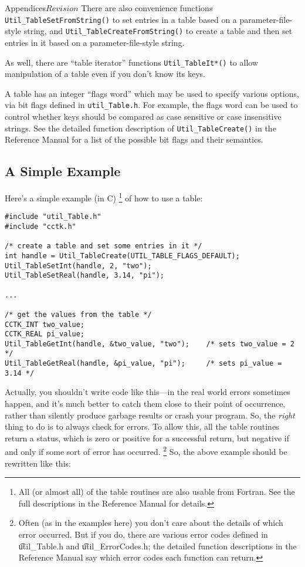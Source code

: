 \begin{cactuspart}{Appendices}{}{$Revision$}
There are also convenience functions \verb|Util_TableSetFromString()|
to set entries in a table based on a parameter-file-style string,
and \verb|Util_TableCreateFromString()| to create a table and then
set entries in it based on a parameter-file-style string.

As well, there are ``table iterator'' functions \verb|Util_TableIt*()|
to allow manipulation of a table even if you don't know its keys.

A table has an integer ``flags word'' which may be used to specify
various options, via bit flags defined in \verb|util_Table.h|.
For example, the flags word can be used to control whether keys
should be compared as case sensitive or case insensitive strings.
See the detailed function description of \verb|Util_TableCreate()|
in the Reference Manual for a list
of the possible bit flags and their semantics.


\subsection{A Simple Example}
\label{Tables_Simple_Example}

Here's a simple example (in C)%
\footnote{%
	 All (or almost all) of the table routines
	 are also usable from Fortran.  See the full
	 descriptions in the Reference Manual
	 for details.
	 }%
{} of how to use a table:
\begin{verbatim}
#include "util_Table.h"
#include "cctk.h"

/* create a table and set some entries in it */
int handle = Util_TableCreate(UTIL_TABLE_FLAGS_DEFAULT);
Util_TableSetInt(handle, 2, "two");
Util_TableSetReal(handle, 3.14, "pi");

...

/* get the values from the table */
CCTK_INT two_value;
CCTK_REAL pi_value;
Util_TableGetInt(handle, &two_value, "two");    /* sets two_value = 2 */
Util_TableGetReal(handle, &pi_value, "pi");     /* sets pi_value = 3.14 */
\end{verbatim}

Actually, you shouldn't write code like this---in the real world
errors sometimes happen, and it's much better to catch them close to
their point of occurrence, rather than silently produce garbage results
or crash your program.  So, the \emph{right} thing to do is to always
check for errors.  To allow this, all the table routines return a status,
which is zero or positive for a successful return, but negative if
and only if some sort of error has occurred.%
\footnote{%
	 Often (as in the examples here) you don't care
	 about the details of which error occurred.  But if
	 you do, there are various error codes defined in
	 {\t util\_Table.h} and {\t util\_ErrorCodes.h};
	 the detailed function descriptions in
	 the Reference Manual
	 say which error codes each function can return.
	 }%
{}  So, the above example should be rewritten like this:


\end{cactuspart}
